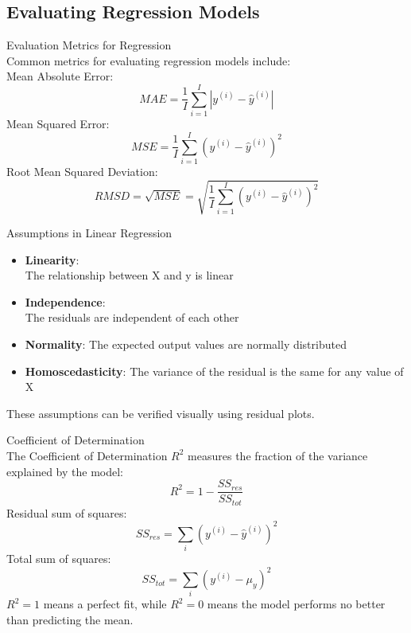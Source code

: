 \subsection{Evaluating Regression Models}


\begin{theorem}{Evaluation Metrics for Regression}\\
Common metrics for evaluating regression models include:\\
    Mean Absolute Error: 
    $$MAE = \frac{1}{I} \sum_{i=1}^{I} |y^{(i)}-\hat{y}^{(i)}|$$
    Mean Squared Error: 
    $$MSE = \frac{1}{I}\sum_{i=1}^{I}(y^{(i)}-\hat{y}^{(i)})^2$$
    Root Mean Squared Deviation: 
    $$RMSD = \sqrt{MSE} = \sqrt{\frac{1}{I}\sum_{i=1}^{I}(y^{(i)}-\hat{y}^{(i)})^2}$$
\end{theorem}

\begin{concept}{Assumptions in Linear Regression}
\begin{itemize}
    \item \textbf{Linearity}: \\The relationship between X and y is linear
    \item \textbf{Independence}: \\The residuals are independent of each other
    \item \textbf{Normality}: The expected output values are normally distributed
    \item \textbf{Homoscedasticity}: The variance of the residual is the same for any value of X
\end{itemize}
These assumptions can be verified visually using residual plots.
\end{concept}

\begin{theorem}{Coefficient of Determination}\\
The Coefficient of Determination $R^2$ measures the fraction of the variance explained by the model:
\[R^2 = 1 - \frac{SS_{res}}{SS_{tot}}\]
Residual sum of squares:
$$SS_{res} = \sum_i (y^{(i)} - \hat{y}^{(i)})^2$$
Total sum of squares:
$$SS_{tot} = \sum_i (y^{(i)} - \mu_y)^2$$
$R^2 = 1$ means a perfect fit, while $R^2 = 0$ means the model performs no better than predicting the mean.
\end{theorem}

